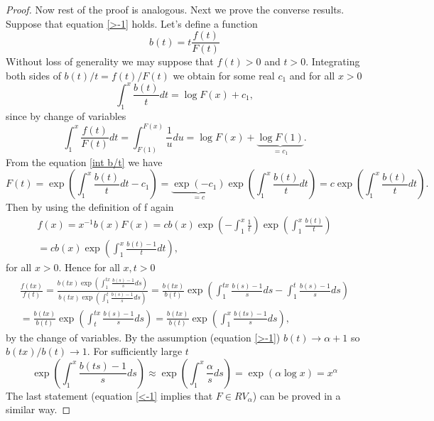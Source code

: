 \documentclass[english,12pt,a4paper,pdftex,sci,utf8]{aaltothesis} %
\begin{document}
\begin{proof}
Now rest of the proof is analogous. Next we prove the converse results. Suppose that equation \ref{>-1} holds. Let's define a function
\begin{equation*}
b(t) = t\frac{f(t)}{F(t)}
\end{equation*}
Without loss of generality we may suppose that $f(t)>0$ and $t>0$. Integrating both sides of $b(t)/t=f(t)/F(t)$ we obtain for some real $c_1$ and for all $x>0$
\begin{equation}
\int_{1}^{x} \frac{b(t)}{t}dt = \log F(x) + c_1,
\label{int b/t}
\end{equation}
since by change of variables
\begin{equation*}
\int_{1}^{x} \frac{f(t)}{F(t)}dt = \int_{F(1)}^{F(x)} \frac{1}{u}du = \log F(x) + \underbrace{\log F(1)}_{=c_1}.
\end{equation*}
From the equation \ref{int b/t} we have
\begin{equation*}
F(t) = \exp \left( \int_1^x \frac{b(t)}{t}dt-c_1 \right) =\underbrace{\exp(-c_1)}_{=c} \exp \left( \int_1^x \frac{b(t)}{t}dt\right) =c \exp \left( \int_1^x \frac{b(t)}{t}dt\right).
\end{equation*}
Then by using the definition of f again
\begin{equation}
\begin{split}
f(x)=x^{-1}b(x)F(x)=cb(x)\exp \left( -\int_1^x \frac{1}{t} \right) \exp \left( \int_1^x \frac{b(t)}{t} \right)\\
=cb(x)\exp \left( \int_1^x \frac{b(t)-1}{t}dt\right),
\label{frep}
\end{split}
\end{equation}
for all $x>0$. Hence for all $x,t>0$
\begin{equation*}
\begin{split}
\frac{f(tx)}{f(t)}=\frac{b(tx)\exp \left( \int_1^{tx} \frac{b(s)-1}{s}ds\right)}{b(tx)\exp \left( \int_1^{t} \frac{b(s)-1}{s}ds\right)} = \frac{b(tx)}{b(t)} \exp \left( \int_1^{tx} \frac{b(s)-1}{s}ds - \int_1^{t} \frac{b(s)-1}{s}ds\right) \\
= \frac{b(tx)}{b(t)} \exp \left( \int_{t}^{tx} \frac{b(s)-1}{s}ds\right)
= \frac{b(tx)}{b(t)} \exp \left( \int_{1}^{x} \frac{b(ts)-1}{s}ds\right),
\end{split}
\end{equation*}
by the change of variables. By the assumption (equation \ref{>-1}) $b(t) \rightarrow \alpha + 1$ so $b(tx)/b(t) \rightarrow 1$. For sufficiently large $t$
\begin{equation*}
\exp \left( \int_{1}^{x} \frac{b(ts)-1}{s}ds\right) \approx \exp \left( \int_{1}^{x} \frac{\alpha}{s}ds\right)=\exp \left(\alpha \log x \right) = x^{\alpha}
\end{equation*}
The last statement (equation \ref{<-1} implies that $F \in RV_{\alpha}$) can be proved in a similar way.
\end{proof}
\end{document}
